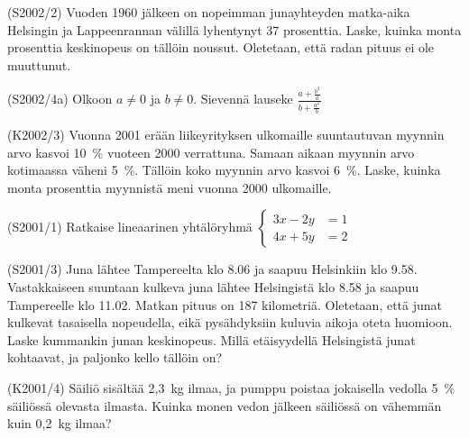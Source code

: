 \begin{tehtava}(S2002/2)   Vuoden 1960 jälkeen on nopeimman junayhteyden matka-aika Helsingin ja Lappeenrannan välillä lyhentynyt 37 prosenttia. Laske, kuinka monta prosenttia keskinopeus on tällöin noussut. Oletetaan, että radan pituus ei ole muuttunut.
\end{tehtava}

\begin{tehtava}(S2002/4a)  Olkoon $ a \neq 0$ ja $b \neq 0 $. Sievennä lauseke
                        $
                            \frac{a + \frac{b^2}{a} } {b + \frac{a^2}{b} }
                        $
\end{tehtava}

\begin{tehtava}(K2002/3)   Vuonna 2001 erään liikeyrityksen ulkomaille suuntautuvan
                        myynnin arvo kasvoi 10~\% vuoteen 2000 verrattuna. Samaan
                        aikaan myynnin arvo kotimaassa väheni 5~\%. Tällöin koko
                        myynnin arvo kasvoi 6~\%. Laske, kuinka monta prosenttia
                        myynnistä meni vuonna 2000 ulkomaille.
\end{tehtava}

\begin{tehtava}(S2001/1)   Ratkaise lineaarinen yhtälöryhmä
                       $
                         \left\{
                          \begin{aligned}
                             3x - 2y &= 1 \\
                             4x + 5y &= 2                      
                         \end{aligned}
                         \right.
                       $
\end{tehtava}

\begin{tehtava}(S2001/3)   Juna lähtee Tampereelta klo 8.06 ja saapuu Helsinkiin klo 9.58.
                        Vastakkaiseen suuntaan kulkeva juna lähtee Helsingistä klo 8.58
                        ja saapuu Tampereelle klo 11.02. Matkan pituus on 187 kilometriä.
                        Oletetaan, että junat kulkevat tasaisella nopeudella, eikä
                        pysähdyksiin kuluvia aikoja oteta huomioon. Laske kummankin
                        junan keskinopeus. Millä etäisyydellä Helsingistä junat
                        kohtaavat, ja paljonko kello tällöin on? 
\end{tehtava}

\begin{tehtava}(K2001/4)   Säiliö sisältää 2,3~kg ilmaa, ja pumppu poistaa jokaisella
                        vedolla 5~\% säiliössä olevasta ilmasta. Kuinka monen vedon
                        jälkeen säiliössä on vähemmän kuin 0,2~kg ilmaa?
\end{tehtava}

